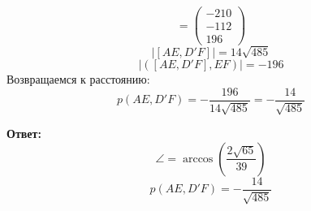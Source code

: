 \documentclass[a4paper,12pt]{article}
\begin{document}
\[
=
\begin{pmatrix}
-210 \\ -112 \\ 196
\end{pmatrix}
\]
\[
|[AE, D'F]| = 14 \sqrt{485}
\]
\[
|\left(\left[AE, D'F\right], EF\right)| = -196
\]
Возвращаемся к расстоянию:
\[
p(AE, D'F) = 
-\frac{196}{14\sqrt{485}} = - \frac{14}{\sqrt{485}}
\]
{\Large \begin{center}
\textbf{Ответ: } 
\[
\angle = \arccos \left( \frac{2 \sqrt{65}}{39} \right)
\]
\[
p(AE, D'F) =  - \frac{14}{\sqrt{485}}
\]
\end{center}}
\end{document}
